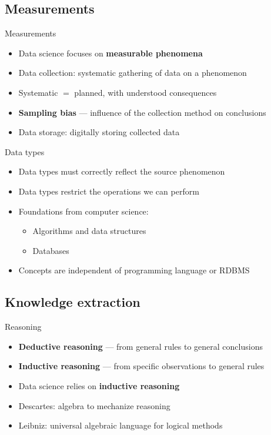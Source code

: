 \subsection{Measurements}

\begin{frame}{Measurements}
  \begin{itemize}
    \item Data science focuses on \textbf{measurable phenomena}
    \item Data collection: systematic gathering of data on a phenomenon
    \item Systematic $=$ planned, with understood consequences
    \item \textbf{Sampling bias} --- influence of the collection method on conclusions
    \item Data storage: digitally storing collected data
  \end{itemize}
\end{frame}

\begin{frame}{Data types}
  \begin{itemize}
    \item Data types must correctly reflect the source phenomenon
    \item Data types restrict the operations we can perform
    \item Foundations from computer science:
      \begin{itemize}
        \item Algorithms and data structures
        \item Databases
      \end{itemize}
    \item Concepts are independent of programming language or RDBMS
  \end{itemize}
\end{frame}

\subsection{Knowledge extraction}

\begin{frame}{Reasoning}
  \begin{itemize}
    \item \textbf{Deductive reasoning} --- from general rules to general conclusions
    \item \textbf{Inductive reasoning} --- from specific observations to general rules
    \item Data science relies on \textbf{inductive reasoning}
    \item Descartes: algebra to mechanize reasoning
    \item Leibniz: universal algebraic language for logical methods
  \end{itemize}
\end{frame}

